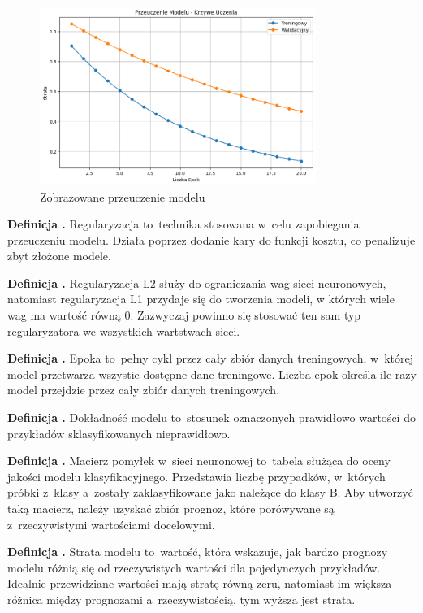 \begin{figure}[ht]
	\centering
	\includegraphics[width=9cm]{resources/machine-learning/images/def_overfit.png}
	\caption{Zobrazowane przeuczenie modelu}
    \label{Fig:def-2}
\end{figure}
\FloatBarrier

\noindent
\textbf{Definicja .}
\incrementdefinitionIndex
Regularyzacja to~technika stosowana w~celu zapobiegania przeuczeniu modelu.
Działa poprzez dodanie kary do funkcji kosztu, co penalizuje zbyt złożone modele.

\noindent
\textbf{Definicja .}
\incrementdefinitionIndex
Regularyzacja L2 służy do ograniczania wag sieci neuronowych,
natomiast regularyzacja L1 przydaje się do tworzenia modeli, w których wiele wag ma wartość równą 0. 
Zazwyczaj powinno się stosować ten sam typ regularyzatora we wszystkich wartstwach sieci.

\noindent
\textbf{Definicja .}
\incrementdefinitionIndex
Epoka to~pełny cykl przez cały zbiór danych treningowych, w~której model przetwarza wszystie dostępne dane treningowe.
Liczba epok określa ile razy model przejdzie przez cały zbiór danych treningowych.

\noindent
\textbf{Definicja .}
\incrementdefinitionIndex
Dokładność modelu to~stosunek oznaczonych prawidłowo wartości do przykładów sklasyfikowanych nieprawidłowo.

\noindent
\textbf{Definicja .}
\incrementdefinitionIndex
Macierz pomyłek w~sieci neuronowej to~tabela służąca do oceny jakości modelu klasyfikacyjnego.
Przedstawia liczbę przypadków, w~których próbki z~klasy a~zostały zaklasyfikowane jako należące do klasy B.
Aby utworzyć taką macierz, należy uzyskać zbiór prognoz, które porówywane są z~rzeczywistymi wartościami docelowymi.

\noindent
\textbf{Definicja .}
\incrementdefinitionIndex
Strata modelu to~wartość, która wskazuje,
jak bardzo prognozy modelu różnią się od rzeczywistych wartości dla pojedynczych przykładów.
Idealnie przewidziane wartości mają stratę równą zeru,
natomiast im większa różnica między prognozami a~rzeczywistością, tym wyższa jest strata.


